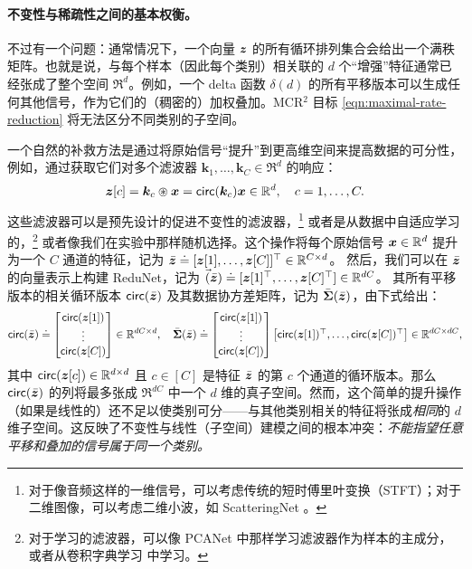 \documentclass[../../book-main.tex]{subfiles}
\begin{document}
\paragraph{不变性与稀疏性之间的基本权衡。}
不过有一个问题：通常情况下，一个向量 $\bm{z}$ 的所有循环排列集合会给出一个满秩矩阵。也就是说，与每个样本（因此每个类别）相关联的 $d$ 个“增强”特征通常已经张成了整个空间 $\Re^d$。例如，一个 delta 函数 $\delta(d)$ 的所有平移版本可以生成任何其他信号，作为它们的（稠密的）加权叠加。MCR$^2$ 目标 \eqref{eqn:maximal-rate-reduction} 将无法区分不同类别的子空间。

一个自然的补救方法是通过将原始信号“提升”到更高维空间来提高数据的可分性，例如，通过获取它们对多个滤波器 $\bm k_1, \ldots, \bm k_C \in \Re^d$ 的响应：
\begin{equation}
\bm z[c] = \bm k_c \circledast \bm x  =  \mathsf{circ}(\bm k_c) \bm x \in \mathbb{R}^d, \quad c = 1, \ldots, C.
\label{eqn:lift-1d}
\end{equation}
这些滤波器可以是预先设计的促进不变性的滤波器，\footnote{对于像音频这样的一维信号，可以考虑传统的短时傅里叶变换（STFT）；对于二维图像，可以考虑二维小波，如 ScatteringNet \cite{scattering-net}。} 或者是从数据中自适应学习的，\footnote{对于学习的滤波器，可以像 PCANet \cite{chan2015pcanet} 中那样学习滤波器作为样本的主成分，或者从卷积字典学习 \cite{li2019multichannel,qu2019nonconvex} 中学习。} 或者像我们在实验中那样随机选择。这个操作将每个原始信号 $\bm{x} \in \mathbb{R}^d$ 提升为一个 $C$ 通道的特征，记为 $\bar{\bm{z}}  \doteq [\bm{z}[1], \ldots, \bm{z}[C]]^\top \in \mathbb{R}^{C\times d}$。
然后，我们可以在 $\bar{\bm{z}}$ 的向量表示上构建 ReduNet，记为
$\vec(\bar{\bm{z}}) \doteq [\bm{z}[1]^\top, \ldots, \bm{z}[C]^\top] \in \mathbb{R}^{dC}$。
其所有平移版本的相关循环版本 $ \mathsf{circ}(\bar{\bm{z}})$ 及其数据协方差矩阵，记为 $\bar{\bm \Sigma}(\bar{\bm{z}})$，由下式给出：
\begin{equation}
\begin{aligned}
 \mathsf{circ}(\bar{\bm{z}}) \doteq \left[\begin{matrix}
    \mathsf{circ}(\bm{z}[1])  \\ \vdots \\ \mathsf{circ}(\bm{z}[C]) \end{matrix} \right] \in \mathbb{R}^{dC\times d},
    \quad  \bar{\bm \Sigma}(\bar{\bm{z}}) \doteq
    \left[\begin{matrix}
    \mathsf{circ}(\bm{z}[1]) \\ \vdots \\ \mathsf{circ}(\bm{z}[C]) \end{matrix} \right]
    \left[\begin{matrix}\mathsf{circ}(\bm{z}[1])^\top,\ldots, \mathsf{circ}(\bm{z}[C])^\top\end{matrix} \right] \in \mathbb{R}^{dC\times dC},
    \label{eqn:W-multichannel}
\end{aligned}
\end{equation}
其中 $\mathsf{circ}(\bm{z}[c]) \in \mathbb{R}^{d\times d}$ 且 $c \in [C]$ 是特征 $\bar {\bm{z}}$ 的第 $c$ 个通道的循环版本。那么 $\mathsf{circ}(\bar{\bm{z}})$ 的列将最多张成 $\Re^{dC}$ 中一个 $d$ 维的真子空间。然而，这个简单的提升操作（如果是线性的）还不足以使类别可分——与其他类别相关的特征将张成{\em 相同}的 $d$ 维子空间。这反映了不变性与线性（子空间）建模之间的根本冲突：{\em 不能指望任意平移和叠加的信号属于同一个类别。}
\end{document}
